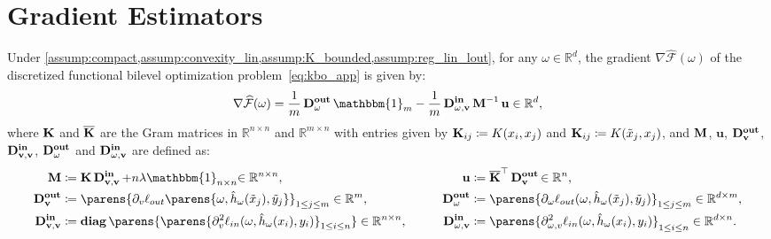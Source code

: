 \section{Gradient Estimators}\label{sec:grad_est}
\begin{proposition}\label{prop:est_2}
Under  \cref{assump:compact,assump:convexity_lin,assump:K_bounded,assump:reg_lin_lout}, for any $\omega\in{\mathbb{R}^d}$, the gradient $\nabla\widehat{\mathcal{F}}(\omega)$ of the discretized functional bilevel optimization problem~\eqref{eq:kbo_app} is given by:
\begin{equation*}
    \nabla\widehat{\mathcal{F}}(\omega)=\frac{1}{m}\Dthree\mathbbm{1}_m-\frac{1}{m}\Dfour\M^{-1}\mathbf{u}\in\mathbb{R}^d,
\end{equation*}
where $\operatorname{\mathbf{K}}$ and $\operatorname{\mathbf{\overline{K}}}$ are the Gram matrices in $\mathbb{R}^{n\times n}$ and $\mathbb{R}^{m\times n}$  with entries given by  $\operatorname{\mathbf{K}}_{ij}\coloneqq K(x_i,x_j)$ and $\operatorname{\mathbf{K}}_{ij}\coloneqq K(\tilde{x}_j,x_j)$, and $\operatorname{\mathbf{M}}$, $\mathbf{u}$, $\operatorname{\mathbf{D_v^{out}}}$, $\operatorname{\mathbf{D_{v,v}^{in}}}$, $\operatorname{\mathbf{D_\omega^{out}}}$ and $\operatorname{\mathbf{D_{\omega,v}^{in}}}$ are defined as:
\begin{align*}
\M&\coloneqq\K\Dtwo+n\lambda\mathbbm{1}_{n\times n}{\in\mathbb{R}^{n\times n}},
\qquad &\mathbf{u} &\coloneqq \Kbar^\top\Done{\in\mathbb{R}^n},\\
	\Done &\coloneqq\parens{\partial_v\ell_{out}\parens{\omega,\hat{h}_\omega(\tilde{x}_j),\tilde{y}_j}}_{1\leq j\leq m}\in\mathbb{R}^m,\quad &
\Dthree &\coloneqq\parens{\partial_\omega \ell_{out}(\omega, \hat{h}_\omega(\tilde{x}_j), \tilde{y}_j)}_{1\leq j\leq m}\in\mathbb{R}^{d\times m},\\
\Dtwo &\coloneqq\diag\parens{\parens{\partial_v^2\ell_{in}(\omega,\hat{h}_\omega(x_i),y_i)}_{1\leq i\leq n}}\in\mathbb{R}^{n\times n},\qquad & 
\Dfour &\coloneqq\parens{\partial_{\omega,v}^2\ell_{in}(\omega,\hat{h}_\omega(x_i),y_i)}_{1\leq i\leq n}\in\mathbb{R}^{d\times n}.
\end{align*}
\end{proposition}
